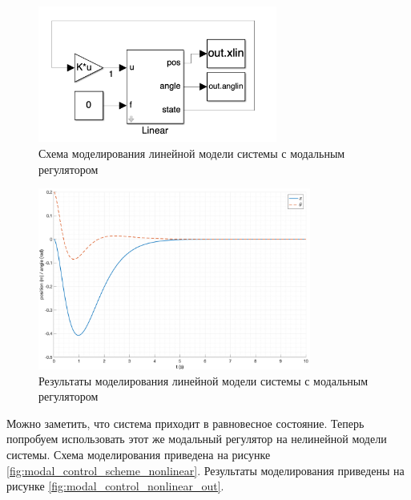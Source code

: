 \begin{figure}[ht!]
    \centering
    \includegraphics[width=0.7\textwidth]{media/modal_control_linear_scheme.png}
    \caption{Схема моделирования линейной модели системы с модальным регулятором}
    \label{fig:modal_control_scheme_linear}
\end{figure}
\begin{figure}[ht!]
    \centering
    \includegraphics[width=0.8\textwidth]{media/plots/modal_control/linear_out_0.png}
    \caption{Результаты моделирования линейной модели системы с модальным регулятором}
    \label{fig:modal_control_linear_out}
\end{figure}

Можно заметить, что система приходит в равновесное состояние. Теперь попробуем использовать этот же 
модальный регулятор на нелинейной модели системы. Схема моделирования приведена на
рисунке \ref{fig:modal_control_scheme_nonlinear}. Результаты моделирования приведены на
рисунке \ref{fig:modal_control_nonlinear_out}.


